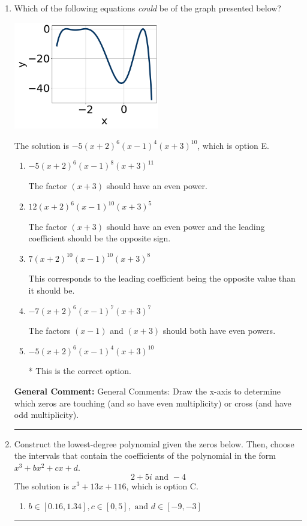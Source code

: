 \documentclass{extbook}[14pt]
\newcommand{\litem}[1]{\item #1

\rule{\textwidth}{0.4pt}}
\begin{document}
\begin{enumerate}\litem{
Which of the following equations \textit{could} be of the graph presented below?

\begin{center}
    \includegraphics[width=0.5\textwidth]{../Figures/polyGraphToFunctionCopyA.png}
\end{center}



The solution is \( -5(x + 2)^{6} (x - 1)^{4} (x + 3)^{10} \), which is option E.\begin{enumerate}[label=\Alph*.]
\item \( -5(x + 2)^{6} (x - 1)^{8} (x + 3)^{11} \)

The factor $(x + 3)$ should have an even power.
\item \( 12(x + 2)^{6} (x - 1)^{10} (x + 3)^{5} \)

The factor $(x + 3)$ should have an even power and the leading coefficient should be the opposite sign.
\item \( 7(x + 2)^{10} (x - 1)^{10} (x + 3)^{8} \)

This corresponds to the leading coefficient being the opposite value than it should be.
\item \( -7(x + 2)^{6} (x - 1)^{7} (x + 3)^{7} \)

The factors $(x - 1)$ and $(x + 3)$ should both have even powers.
\item \( -5(x + 2)^{6} (x - 1)^{4} (x + 3)^{10} \)

* This is the correct option.
\end{enumerate}

\textbf{General Comment:} General Comments: Draw the x-axis to determine which zeros are touching (and so have even multiplicity) or cross (and have odd multiplicity).
}
\litem{
Construct the lowest-degree polynomial given the zeros below. Then, choose the intervals that contain the coefficients of the polynomial in the form $x^3+bx^2+cx+d$.
\[ 2 + 5 i \text{ and } -4 \]
The solution is \( x^{3} +13 x + 116 \), which is option C.\begin{enumerate}[label=\Alph*.]
\item \( b \in [0.16, 1.34], c \in [0, 5], \text{ and } d \in [-9, -3] \)


\end{enumerate}}
\end{enumerate}
\end{document}
